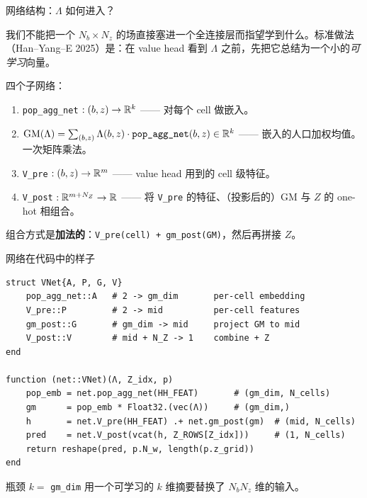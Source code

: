 \documentclass[10pt,aspectratio=169]{beamer}
\begin{document}
\begin{frame}{网络结构：$\Lambda$ 如何进入？}

我们不能把一个 $N_b \times N_z$ 的场直接塞进一个全连接层而指望学到什么。标准做法（Han--Yang--E 2025）是：在 value head 看到 $\Lambda$ 之前，先把它总结为一个小的\emph{可学习}向量。

\smallskip

四个子网络：
\begin{enumerate}
  \item \texttt{pop\_agg\_net} $: (b, z) \to \mathbb{R}^{k}$ —— 对每个 cell 做嵌入。
  \item $\mathrm{GM}(\Lambda) = \sum_{(b,z)} \Lambda(b, z) \cdot \texttt{pop\_agg\_net}(b, z) \in \mathbb{R}^k$ —— 嵌入的人口加权均值。一次矩阵乘法。
  \item \texttt{V\_pre} $: (b, z) \to \mathbb{R}^m$ —— value head 用到的 cell 级特征。
  \item \texttt{V\_post} $: \mathbb{R}^{m + N_Z} \to \mathbb{R}$ —— 将 \texttt{V\_pre} 的特征、（投影后的）GM 与 $Z$ 的 one-hot 相组合。
\end{enumerate}

\smallskip

组合方式是\textbf{加法的}：\texttt{V\_pre(cell) + gm\_post(GM)}，然后再拼接 $Z$。

\end{frame}

\begin{frame}[fragile]{网络在代码中的样子}
\begin{lstlisting}
struct VNet{A, P, G, V}
    pop_agg_net::A   # 2 -> gm_dim       per-cell embedding
    V_pre::P         # 2 -> mid          per-cell features
    gm_post::G       # gm_dim -> mid     project GM to mid
    V_post::V        # mid + N_Z -> 1    combine + Z
end

function (net::VNet)(Λ, Z_idx, p)
    pop_emb = net.pop_agg_net(HH_FEAT)       # (gm_dim, N_cells)
    gm      = pop_emb * Float32.(vec(Λ))     # (gm_dim,)
    h       = net.V_pre(HH_FEAT) .+ net.gm_post(gm)  # (mid, N_cells)
    pred    = net.V_post(vcat(h, Z_ROWS[Z_idx]))     # (1, N_cells)
    return reshape(pred, p.N_w, length(p.z_grid))
end
\end{lstlisting}

瓶颈 $k = $ \texttt{gm\_dim} 用一个可学习的 $k$ 维摘要替换了 $N_b N_z$ 维的输入。

\end{frame}
\end{document}
